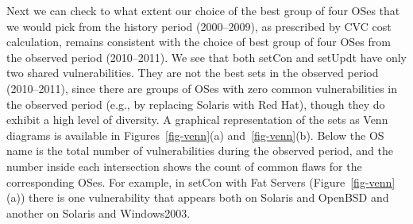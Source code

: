 Next we can check to what extent our choice of the best group of four OSes that we would pick from the history period (2000--2009), as prescribed by CVC cost calculation, remains consistent with the choice of best group of four OSes from the observed period (2010--2011). We see that both setCon and setUpdt have only two shared vulnerabilities. They are not the best sets in the observed period (2010--2011), since there are groups of OSes with zero common vulnerabilities in the observed period (e.g., by replacing Solaris with Red Hat), though they do exhibit a high level of diversity. A graphical representation of the sets as Venn diagrams is available in Figures~\ref{fig-venn}(a) and~\ref{fig-venn}(b). Below the OS name is the total number of vulnerabilities during the observed period, and the number inside each intersection shows the count of common flaws for the corresponding OSes. For example, in setCon with Fat Servers (Figure~\ref{fig-venn}(a)) there is one vulnerability that appears both on Solaris and OpenBSD and another on Solaris and Windows2003.


